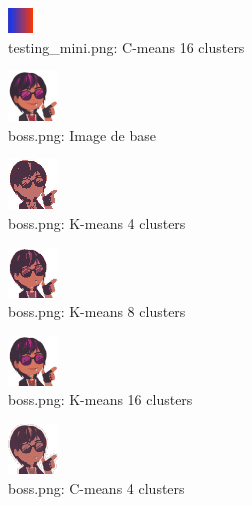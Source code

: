 \documentclass{article}
\begin{document}
  \begin{figure}[h]
    \centering
    \includegraphics[scale=6]{images/result_testing_mini_c_16.png}
    \caption{testing\_mini.png: C-means 16 clusters}
    \label{fig:}
  \end{figure}



  \iffalse
  \begin{figure}
    \includegraphics[scale=2]{images/boss.png}
    \caption{boss.png: Image de base}
    \label{fig:}
  \end{figure}

  \begin{figure}
    \includegraphics[scale=2]{images/result_boss_k_4.png}
    \caption{boss.png: K-means 4 clusters}
    \label{fig:}
  \end{figure}

  \begin{figure}
    \includegraphics[scale=2]{images/result_boss_k_8.png}
    \caption{boss.png: K-means 8 clusters}
    \label{fig:}
  \end{figure}

  \begin{figure}
    \includegraphics[scale=2]{images/result_boss_k_16.png}
    \caption{boss.png: K-means 16 clusters}
    \label{fig:}
  \end{figure}

  \begin{figure}
    \includegraphics[scale=2]{images/result_boss_c_4.png}
    \caption{boss.png: C-means 4 clusters}
    \label{fig:}
  \end{figure}
\end{document}
